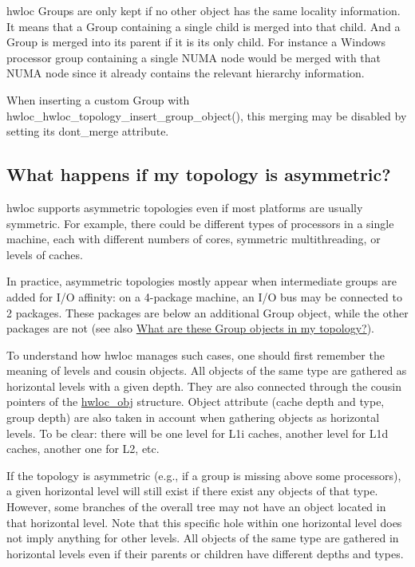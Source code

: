 hwloc Groups are only kept if no other object has the same locality information. It means that a Group containing a single child is merged into that child. And a Group is merged into its parent if it is its only child. For instance a Windows processor group containing a single N\+U\+MA node would be merged with that N\+U\+MA node since it already contains the relevant hierarchy information.

When inserting a custom Group with hwloc\+\_\+hwloc\+\_\+topology\+\_\+insert\+\_\+group\+\_\+object(), this merging may be disabled by setting its {\ttfamily dont\+\_\+merge} attribute.\hypertarget{a00394_faq_asymmetric}{}\subsection{What happens if my topology is asymmetric?}\label{a00394_faq_asymmetric}
hwloc supports asymmetric topologies even if most platforms are usually symmetric. For example, there could be different types of processors in a single machine, each with different numbers of cores, symmetric multithreading, or levels of caches.

In practice, asymmetric topologies mostly appear when intermediate groups are added for I/O affinity\+: on a 4-\/package machine, an I/O bus may be connected to 2 packages. These packages are below an additional Group object, while the other packages are not (see also \hyperlink{a00394_faq_groups}{What are these Group objects in my topology?}).

To understand how hwloc manages such cases, one should first remember the meaning of levels and cousin objects. All objects of the same type are gathered as horizontal levels with a given depth. They are also connected through the cousin pointers of the \hyperlink{a00238}{hwloc\+\_\+obj} structure. Object attribute (cache depth and type, group depth) are also taken in account when gathering objects as horizontal levels. To be clear\+: there will be one level for L1i caches, another level for L1d caches, another one for L2, etc.

If the topology is asymmetric (e.\+g., if a group is missing above some processors), a given horizontal level will still exist if there exist any objects of that type. However, some branches of the overall tree may not have an object located in that horizontal level. Note that this specific hole within one horizontal level does not imply anything for other levels. All objects of the same type are gathered in horizontal levels even if their parents or children have different depths and types.

